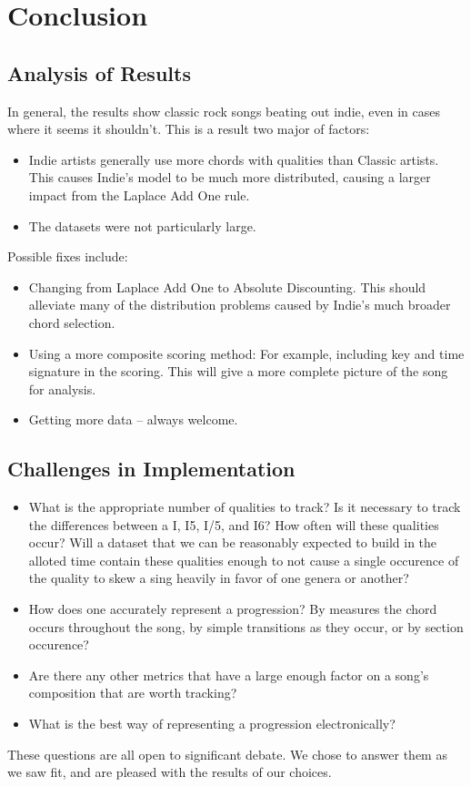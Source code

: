 \documentclass{article}
\begin{document}
\newpage

\section{Conclusion}

\subsection{Analysis of Results}
In general, the results show classic rock songs beating out indie, even in cases where it seems it shouldn't.  This is a result two major of factors:
\begin{itemize}
	\item Indie artists generally use more chords with qualities than Classic artists.  This causes Indie's model to be much more distributed, causing a larger impact from the Laplace Add One rule.
	\item The datasets were not particularly large.
\end {itemize}

Possible fixes include:
\begin{itemize}
	\item Changing from Laplace Add One to Absolute Discounting.  This should alleviate many of the distribution problems caused by Indie's much broader chord selection.
	\item Using a more composite scoring method:  For example, including key and time signature in the scoring.  This will give a more complete picture of the song for analysis.
	\item Getting more data -- always welcome.
\end{itemize}

\subsection{Challenges in Implementation}
\begin{itemize}
	\item What is the appropriate number of qualities to track?  Is it necessary to track the differences between a I, I5, I/5, and I6?  How often will these qualities occur?  Will a dataset that we can be reasonably expected to build in the alloted time contain these qualities enough to not cause a single occurence of the quality to skew a sing heavily in favor of one genera or another? 
	\item How does one accurately represent a progression?  By measures the chord occurs throughout the song, by simple transitions as they occur, or by section occurence?
	\item Are there any other metrics that have a large enough factor on a song's composition that are worth tracking?
	\item What is the best way of representing a progression electronically?
\end{itemize}
These questions are all open to significant debate.  We chose to answer them as we saw fit, and are pleased with the results of our choices.
\end{document}
